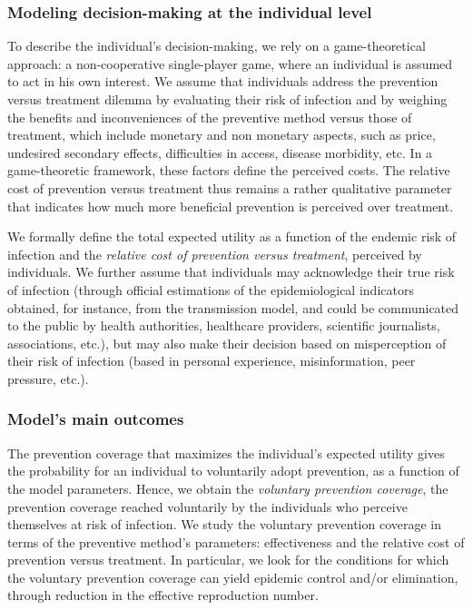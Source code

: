 \subsubsection{Modeling decision-making at the individual level}
To describe the individual's decision-making, we rely on a game-theoretical approach: a non-cooperative single-player game, where an individual is assumed to act in his own interest. 
We assume that individuals address the prevention versus treatment dilemma by evaluating their risk of infection and by weighing the benefits and inconveniences of the preventive method versus those of treatment, which include monetary and non monetary aspects, such as price, undesired secondary effects, difficulties in access, disease morbidity, etc. In a game-theoretic framework, these factors define the perceived costs. The relative cost of prevention versus treatment thus remains a rather qualitative parameter that indicates how much more beneficial prevention is perceived over treatment.

We formally define the total expected utility as a function of the endemic risk of infection and the {\it relative cost of prevention versus treatment}, perceived by individuals. We further assume that individuals may acknowledge their true risk of infection (through official estimations of the epidemiological indicators obtained, for instance, from the transmission model, and could be communicated to the public by health authorities, healthcare providers, scientific journalists, associations, etc.), but may also make their decision based on misperception of their risk of infection (based in personal experience, misinformation, peer pressure, etc.). 

\subsubsection{Model's main outcomes}
The prevention coverage that maximizes the individual's expected utility gives the probability for an individual to voluntarily adopt prevention, as a function of the model parameters. Hence, we obtain the {\it voluntary prevention coverage}, the prevention coverage reached voluntarily by the individuals who perceive themselves at risk of infection. 
%
We study the voluntary prevention coverage in terms of the preventive method's parameters: effectiveness and the relative cost of prevention versus treatment. In particular, we look for the conditions for which the voluntary prevention coverage can yield epidemic control and/or elimination, through reduction in the effective reproduction number.

